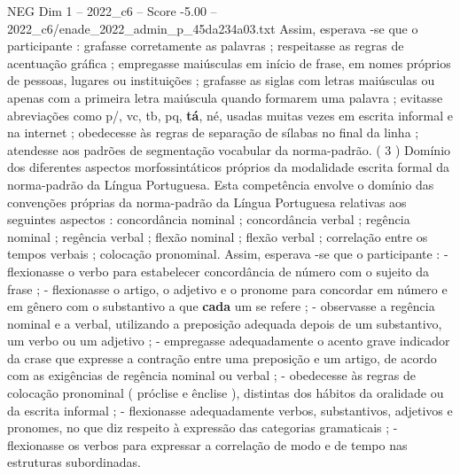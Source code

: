 \begin{textsample}{NEG Dim 1 – 2022\_c6 – Score -5.00 – 2022\_c6/enade\_2022\_admin\_p\_45da234a03.txt}
Assim, esperava -se que o participante : grafasse corretamente as palavras ; respeitasse as regras de acentuação gráfica ; empregasse maiúsculas em início de frase, em nomes próprios de pessoas, lugares ou instituições ; grafasse as siglas com letras maiúsculas ou apenas com a primeira letra maiúscula quando formarem uma palavra ; evitasse abreviações como p/, vc, tb, pq, \textbf{tá}, né, usadas muitas vezes em escrita informal e na internet ; obedecesse às regras de separação de sílabas no final da linha ; atendesse aos padrões de segmentação vocabular da norma-padrão. ( 3 ) Domínio dos diferentes aspectos morfossintáticos próprios da modalidade escrita formal da norma-padrão da Língua Portuguesa.
Esta competência envolve o domínio das convenções próprias da norma-padrão da Língua Portuguesa relativas aos seguintes aspectos : concordância nominal ; concordância verbal ; regência nominal ; regência verbal ; flexão nominal ; flexão verbal ; correlação entre os tempos verbais ; colocação pronominal.
Assim, esperava -se que o participante : - flexionasse o verbo para estabelecer concordância de número com o sujeito da frase ; - flexionasse o artigo, o adjetivo e o pronome para concordar em número e em gênero com o substantivo a que \textbf{cada} um se refere ; - observasse a regência nominal e a verbal, utilizando a preposição adequada depois de um substantivo, um verbo ou um adjetivo ; - empregasse adequadamente o acento grave indicador da crase que expresse a contração entre uma preposição e um artigo, de acordo com as exigências de regência nominal ou verbal ; - obedecesse às regras de colocação pronominal ( próclise e ênclise ), distintas dos hábitos da oralidade ou da escrita informal ; - flexionasse adequadamente verbos, substantivos, adjetivos e pronomes, no que diz respeito à expressão das categorias gramaticais ; - flexionasse os verbos para expressar a correlação de modo e de tempo nas estruturas subordinadas.

\end{textsample}
